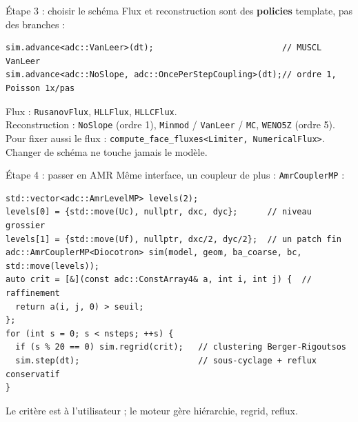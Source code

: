 \documentclass[11pt,aspectratio=169]{beamer}
\begin{document}
\begin{frame}[fragile]{Étape 3 : choisir le schéma}
Flux et reconstruction sont des \textbf{policies} template, pas des branches :

\begin{lstlisting}
sim.advance<adc::VanLeer>(dt);                          // MUSCL VanLeer
sim.advance<adc::NoSlope, adc::OncePerStepCoupling>(dt);// ordre 1, Poisson 1x/pas
\end{lstlisting}

\vspace{0.5em}
\small
Flux : \texttt{RusanovFlux}, \texttt{HLLFlux}, \texttt{HLLCFlux}. \\
Reconstruction : \texttt{NoSlope} (ordre 1), \texttt{Minmod} / \texttt{VanLeer} / \texttt{MC}, \texttt{WENO5Z} (ordre 5). \\[0.3em]
Pour fixer aussi le flux : \texttt{compute\_face\_fluxes<Limiter, NumericalFlux>}.
Changer de schéma ne touche jamais le modèle.
\end{frame}

\begin{frame}[fragile]{Étape 4 : passer en AMR}
Même interface, un coupleur de plus : \texttt{AmrCouplerMP} :

\begin{lstlisting}[basicstyle=\ttfamily\footnotesize]
std::vector<adc::AmrLevelMP> levels(2);
levels[0] = {std::move(Uc), nullptr, dxc, dyc};      // niveau grossier
levels[1] = {std::move(Uf), nullptr, dxc/2, dyc/2};  // un patch fin
adc::AmrCouplerMP<Diocotron> sim(model, geom, ba_coarse, bc, std::move(levels));
auto crit = [&](const adc::ConstArray4& a, int i, int j) {  // raffinement
  return a(i, j, 0) > seuil;
};
for (int s = 0; s < nsteps; ++s) {
  if (s % 20 == 0) sim.regrid(crit);   // clustering Berger-Rigoutsos
  sim.step(dt);                        // sous-cyclage + reflux conservatif
}
\end{lstlisting}

\vspace{0.2em}
\small Le critère est à l'utilisateur ; le moteur gère hiérarchie, regrid, reflux.
\end{frame}
\end{document}
